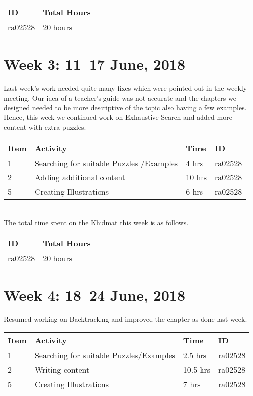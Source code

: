 \documentclass{article}
\begin{document}
\begin{tabular}{|l|l|}
  \hline
  ID & Total Hours\\\hline\hline
  ra02528 & 20 hours\\\hline
\end{tabular}

\newpage %
\section*{Week 3: 11--17 June, 2018}
Last week's work needed quite many fixes which were pointed out in the weekly meeting. Our idea of a teacher's guide was not accurate and the chapters we designed needed to be more descriptive of the topic also having a few examples. Hence, this week we continued work on Exhaustive Search and added more content with extra puzzles.
\\

\begin{tabular}{|l|l|l|l|}
  \hline
  Item 	& Activity & Time & ID \\\hline\hline
  1	& Searching for suitable Puzzles /Examples & 4 hrs & ra02528 \\\hline
  2	& Adding additional content & 10 hrs & ra02528 \\\hline
  5	& Creating Illustrations & 6 hrs & ra02528 \\\hline
\end{tabular}\\

The total time spent on the Khidmat this week is as follows.

\begin{tabular}{|l|l|}
  \hline
  ID & Total Hours\\\hline\hline
  ra02528 & 20 hours\\\hline
\end{tabular}

\newpage %
\section*{Week 4: 18--24 June, 2018}
Resumed working on Backtracking and improved the chapter as done last week.\\


\begin{tabular}{|l|l|l|l|}
  \hline
  Item 	& Activity & Time & ID \\\hline\hline
  1	& Searching for suitable Puzzles/Examples & 2.5 hrs & ra02528 \\\hline
  2	& Writing content & 10.5 hrs & ra02528 \\\hline
  5	& Creating Illustrations & 7 hrs & ra02528 \\\hline
\end{tabular}\\
\end{document}
